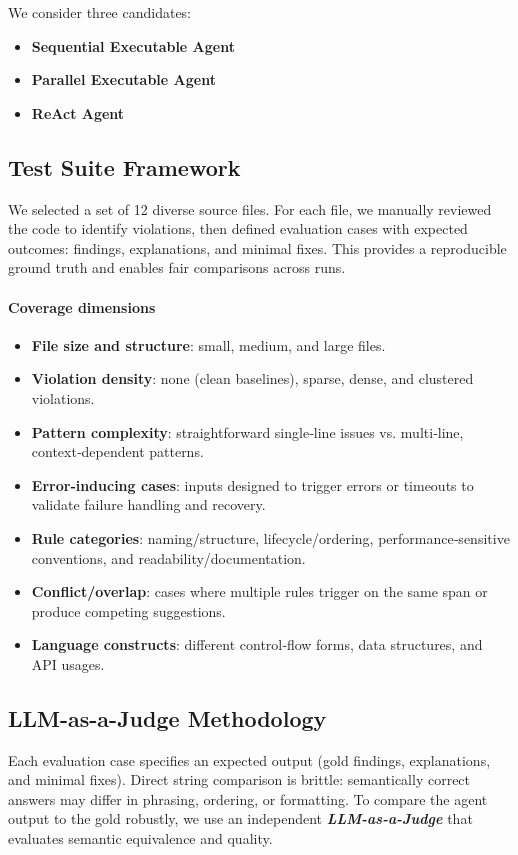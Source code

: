 \begin{spacing}{1.2}
We consider three candidates:

\begin{itemize}
    \item \textbf{Sequential Executable Agent}
    \item \textbf{Parallel Executable Agent}
    \item \textbf{ReAct Agent}
\end{itemize}

\subsection{Test Suite Framework}
We selected a set of 12 diverse source files. For each file, we manually reviewed the code to identify violations, then defined evaluation cases with expected outcomes: findings, explanations, and minimal fixes. This provides a reproducible ground truth and enables fair comparisons across runs.

\paragraph{Coverage dimensions}
\begin{itemize}
    \item \textbf{File size and structure}: small, medium, and large files.
    \item \textbf{Violation density}: none (clean baselines), sparse, dense, and clustered violations.
    \item \textbf{Pattern complexity}: straightforward single‑line issues vs. multi‑line, context‑dependent patterns.
    \item \textbf{Error‑inducing cases}: inputs designed to trigger errors or timeouts to validate failure handling and recovery.
    \item \textbf{Rule categories}: naming/structure, lifecycle/ordering, performance‑sensitive conventions, and readability/documentation.
    \item \textbf{Conflict/overlap}: cases where multiple rules trigger on the same span or produce competing suggestions.
    \item \textbf{Language constructs}: different control‑flow forms, data structures, and API usages.
\end{itemize}


\subsection{LLM-as-a-Judge Methodology}
Each evaluation case specifies an expected output (gold findings, explanations, and minimal fixes). Direct string comparison is brittle: semantically correct answers may differ in phrasing, ordering, or formatting. To compare the agent output to the gold robustly, we use an independent \textbf{\emph{LLM-as-a-Judge}} that evaluates semantic equivalence and quality.


\end{spacing}
